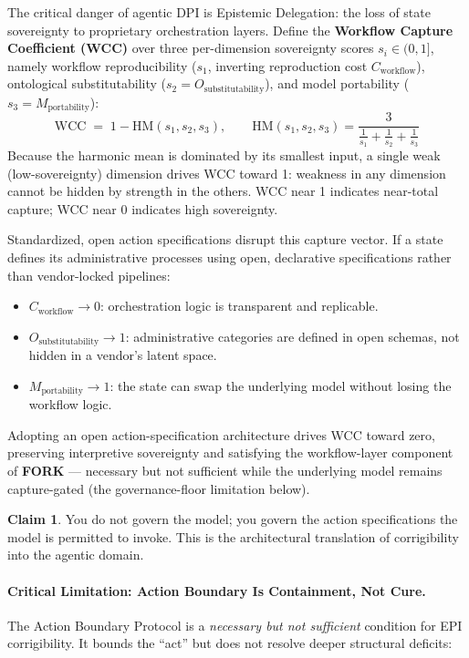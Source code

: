 \documentclass{article}
\theoremstyle{definition}
\newtheorem{claim}{Claim}[section]
\begin{document}
The critical danger of agentic DPI is Epistemic Delegation: the loss of state sovereignty to proprietary orchestration layers. Define the \textbf{Workflow Capture Coefficient (WCC)} over three per-dimension sovereignty scores $s_i \in (0,1]$, namely workflow reproducibility ($s_1$, inverting reproduction cost $C_{\text{workflow}}$), ontological substitutability ($s_2 = O_{\text{substitutability}}$), and model portability ($s_3 = M_{\text{portability}}$):
\begin{equation}
\text{WCC} \;=\; 1 - \mathrm{HM}(s_1, s_2, s_3), \qquad \mathrm{HM}(s_1,s_2,s_3) = \frac{3}{\tfrac{1}{s_1} + \tfrac{1}{s_2} + \tfrac{1}{s_3}}
\label{eq:wcc}
\end{equation}
Because the harmonic mean is dominated by its smallest input, a single weak (low-sovereignty) dimension drives WCC toward 1: weakness in any dimension cannot be hidden by strength in the others. WCC near 1 indicates near-total capture; WCC near 0 indicates high sovereignty.

Standardized, open action specifications disrupt this capture vector. If a state defines its administrative processes using open, declarative specifications rather than vendor-locked pipelines:

\begin{itemize}[noitemsep]
    \item $C_{\text{workflow}} \to 0$: orchestration logic is transparent and replicable.
    \item $O_{\text{substitutability}} \to 1$: administrative categories are defined in open schemas, not hidden in a vendor's latent space.
    \item $M_{\text{portability}} \to 1$: the state can swap the underlying model without losing the workflow logic.
\end{itemize}

Adopting an open action-specification architecture drives WCC toward zero, preserving interpretive sovereignty and satisfying the workflow-layer component of \textbf{FORK} --- necessary but not sufficient while the underlying model remains capture-gated (the governance-floor limitation below).

\begin{claim}
You do not govern the model; you govern the action specifications the model is permitted to invoke. This is the architectural translation of corrigibility into the agentic domain.
\end{claim}

\paragraph{Critical Limitation: Action Boundary Is Containment, Not Cure.} The Action Boundary Protocol is a \textit{necessary but not sufficient} condition for EPI corrigibility. It bounds the ``act'' but does not resolve deeper structural deficits:
\end{document}
